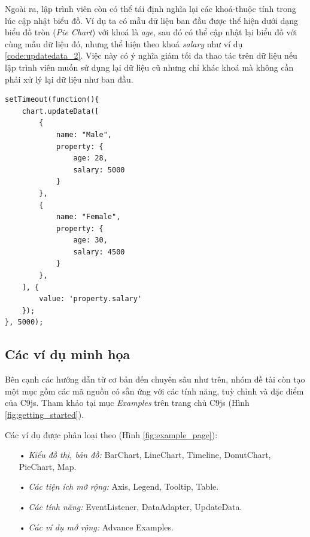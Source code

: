 \documentclass[12pt,a4paper]{article}
\begin{document}
Ngoài ra, lập trình viên còn có thể tái định nghĩa lại các khoá-thuộc tính trong lúc cập nhật biểu đồ. Ví dụ ta có mẫu dữ liệu ban đầu được thể hiện dưới dạng biểu đồ tròn (\textit{Pie Chart}) với khoá là \textit{age}, sau đó có thể cập nhật lại biểu đồ với cùng mẫu dữ liệu đó, nhưng thể hiện theo khoá \textit{salary} như ví dụ \ref{code:updatedata_2}. Việc này có ý nghĩa giảm tối đa thao tác trên dữ liệu nếu lập trình viên muốn sử dụng lại dữ liệu cũ nhưng chỉ khác khoá mà không cần phải xử lý lại dữ liệu như ban đầu.

\begin{lstlisting}[caption=Định nghĩa lại khoá-thuộc tính trong lúc cập nhật, label={code:updatedata_2}]
setTimeout(function(){
    chart.updateData([
        {
            name: "Male", 
            property: {
                age: 28,
                salary: 5000
            }
        },
        {
            name: "Female", 
            property: {
                age: 30,
                salary: 4500
            }
        },
    ], {
        value: 'property.salary'
    });
}, 5000);
\end{lstlisting}

\subsection{Các ví dụ minh họa}
Bên cạnh các hướng dẫn từ cơ bản đến chuyên sâu như trên, nhóm đề tài còn tạo một mục gồm các mã nguồn có sẵn ứng với các tính năng, tuỳ chỉnh và đặc điểm của C9js. Tham khảo tại mục \textit{Examples} trên trang chủ C9js (Hình \ref{fig:getting_started}). 

Các ví dụ được phân loại theo (Hình \ref{fig:example_page}):
\begin{itemize}
\item[•] \emph{Kiểu đồ thị, bản đồ:} BarChart, LineChart, Timeline, DonutChart, PieChart, Map.
\item[•] \emph{Các tiện ích mở rộng:} Axis, Legend, Tooltip, Table.
\item[•] \emph{Các tính năng:} EventListener, DataAdapter, UpdateData.
\item[•] \emph{Các ví dụ mở rộng:} Advance Examples.
\end{itemize}
\end{document}
